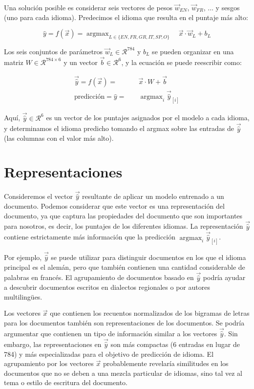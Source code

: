 Una solución posible es considerar seis vectores de pesos $\vec{w}_{EN}$, $\vec{w}_{FR}$, $\dots$ y sesgos (uno para cada idioma). Predecimos el idioma que resulta en el puntaje más alto:

\begin{equation}
 \hat{y} = f(\vec{x}) = \operatorname{argmax}_{L \in \{ EN,FR,GR,IT,SP,O \}} \quad \vec{x}\cdot \vec{w}_L+ b_{L}
\end{equation}

Los seis conjuntos de parámetros $\vec{w}_L \in  \mathcal{R}^{784}$ y $b_L$ se pueden organizar en una matriz $W \in \mathcal{R}^{784\times6}$ y un vector $\vec{b} \in \mathcal R^6$, y la ecuación se puede reescribir como:

\begin{equation}
 \begin{split}
  \vec{\hat{y}} = f(\vec{x}) = \quad & \vec{x} \cdot W + \vec{b}\\
   \text{predicción} = \hat{y} = \quad  & \operatorname{argmax}_i \vec{\hat{y}}_{[i]}
 \end{split}
\end{equation}

Aquí, $\vec{\hat{y}} \in \mathcal{R}^6$ es un vector de los puntajes asignados por el modelo a cada idioma, y determinamos el idioma predicho tomando el argmax sobre las entradas de $\vec{\hat{y}}$ (las columnas con el valor más alto).

\section{Representaciones}
Consideremos el vector $\vec{\hat{y}}$ resultante de aplicar un modelo entrenado a un documento. Podemos considerar que este vector es una representación del documento, ya que captura las propiedades del documento que son importantes para nosotros, es decir, los puntajes de los diferentes idiomas. La representación $\vec{\hat{y}}$ contiene estrictamente más información que la predicción $\operatorname{argmax}_i \vec{\hat{y}}_{[i]}$.

Por ejemplo, $\vec{\hat{y}}$ se puede utilizar para distinguir documentos en los que el idioma principal es el alemán, pero que también contienen una cantidad considerable de palabras en francés. El agrupamiento de documentos basado en $\vec{\hat{y}}$ podría ayudar a descubrir documentos escritos en dialectos regionales o por autores multilingües.

Los vectores $\vec{x}$ que contienen los recuentos normalizados de los bigramas de letras para los documentos también son representaciones de los documentos. Se podría argumentar que contienen un tipo de información similar a los vectores $\vec{\hat{y}}$. Sin embargo, las representaciones en $\vec{\hat{y}}$ son más compactas (6 entradas en lugar de 784) y más especializadas para el objetivo de predicción de idioma. El agrupamiento por los vectores $\vec{x}$ probablemente revelaría similitudes en los documentos que no se deben a una mezcla particular de idiomas, sino tal vez al tema o estilo de escritura del documento.

